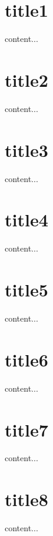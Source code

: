 \documentclass{beamer}
\begin{document}
    
\begin{frame}
\end{frame} 

\section{title1}
\begin{frame}
content...
\end{frame}
\section{title2}
\begin{frame}
content...
\end{frame}
\section{title3}
\begin{frame}
content...
\end{frame}
\section{title4}
\begin{frame}
content...
\end{frame}
\section{title5}
\begin{frame}
content...
\end{frame}
\section{title6}
\begin{frame}
content...
\end{frame}
\section{title7}
\begin{frame}
content...
\end{frame}
\section{title8}
\begin{frame}
content...
\end{frame}

    
\end{document}

